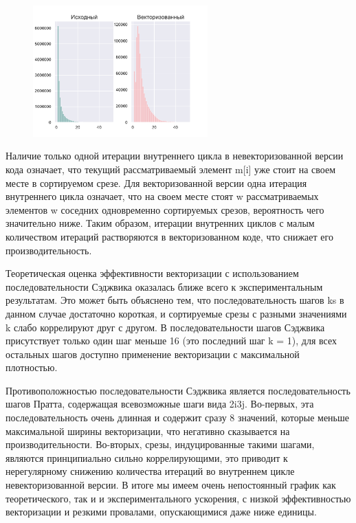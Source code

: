 \begin{figure}[ht]
	\centering
		\includegraphics[width=0.6\textwidth]{./pics/text_4_vec_irreg/hibbard_k_15.pdf}
	\caption{}
	\label{fig:text_4_vec_irreg_hibbard_k_15}
\end{figure}

Наличие только одной итерации внутреннего цикла в невекторизованной версии кода означает, что текущий рассматриваемый элемент m[i] уже стоит на своем месте в сортируемом срезе.
Для векторизованной версии одна итерация внутреннего цикла означает, что на своем месте стоят w рассматриваемых элементов w соседних одновременно сортируемых срезов, вероятность чего значительно ниже.
Таким образом, итерации внутренних циклов с малым количеством итераций растворяются в векторизованном коде, что снижает его производительность.

Теоретическая оценка эффективности векторизации с использованием последовательности Сэджвика оказалась ближе всего к экспериментальным результатам.
Это может быть объяснено тем, что последовательность шагов ks в данном случае достаточно короткая, и сортируемые срезы с разными значениями k слабо коррелируют друг с другом.
В последовательности шагов Сэджвика присутствует только один шаг меньше 16 (это последний шаг k = 1), для всех остальных шагов доступно применение векторизации с максимальной плотностью.

Противоположностью последовательности Сэджвика является последовательность шагов Пратта, содержащая всевозможные шаги вида 2i3j.
Во-первых, эта последовательность очень длинная и содержит сразу 8 значений, которые меньше максимальной ширины векторизации, что негативно сказывается на производительности.
Во-вторых, срезы, индуцированные такими шагами, являются принципиально сильно коррелирующими, это приводит к нерегулярному снижению количества итераций во внутреннем цикле невекторизованной версии.
В итоге мы имеем очень непостоянный график как теоретического, так и и экспериментального ускорения, с низкой эффективностью векторизации и резкими провалами, опускающимися даже ниже единицы.
